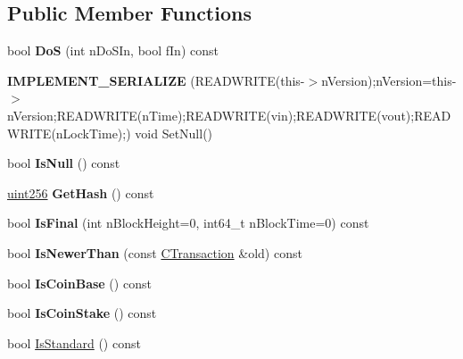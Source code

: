 \subsection*{Public Member Functions}
\begin{DoxyCompactItemize}
\item 
\mbox{\label{class_c_transaction_ae5f57b4b90e5a179bb359bdf72fba753}} 
bool {\bfseries DoS} (int n\+Do\+S\+In, bool f\+In) const
\item 
\mbox{\label{class_c_transaction_a3ff1ff42b9bf57f476879922b3c20134}} 
{\bfseries I\+M\+P\+L\+E\+M\+E\+N\+T\+\_\+\+S\+E\+R\+I\+A\+L\+I\+ZE} (R\+E\+A\+D\+W\+R\+I\+TE(this-\/$>$n\+Version);n\+Version=this-\/$>$n\+Version;R\+E\+A\+D\+W\+R\+I\+TE(n\+Time);R\+E\+A\+D\+W\+R\+I\+TE(vin);R\+E\+A\+D\+W\+R\+I\+TE(vout);R\+E\+A\+D\+W\+R\+I\+TE(n\+Lock\+Time);) void Set\+Null()
\item 
\mbox{\label{class_c_transaction_a52965f371d2d3f723e88e60c8e68d6d0}} 
bool {\bfseries Is\+Null} () const
\item 
\mbox{\label{class_c_transaction_a0b46d80e82ca324e82c2ce3fc1492bfa}} 
\mbox{\hyperlink{classuint256}{uint256}} {\bfseries Get\+Hash} () const
\item 
\mbox{\label{class_c_transaction_af8724c9ec3e1602263bc8efc79f5bbf4}} 
bool {\bfseries Is\+Final} (int n\+Block\+Height=0, int64\+\_\+t n\+Block\+Time=0) const
\item 
\mbox{\label{class_c_transaction_a3052d1f8bc834e83ab91bd4dd2778241}} 
bool {\bfseries Is\+Newer\+Than} (const \mbox{\hyperlink{class_c_transaction}{C\+Transaction}} \&old) const
\item 
\mbox{\label{class_c_transaction_a96256e8ac1bf79ad9c057e48c41132dd}} 
bool {\bfseries Is\+Coin\+Base} () const
\item 
\mbox{\label{class_c_transaction_ace4278a41a296d40dcf5fb2b9cf007ec}} 
bool {\bfseries Is\+Coin\+Stake} () const
\item 
bool \mbox{\hyperlink{class_c_transaction_a270e669ab6d491a44d50383ad8ce622b}{Is\+Standard}} () const

\end{DoxyCompactItemize}

